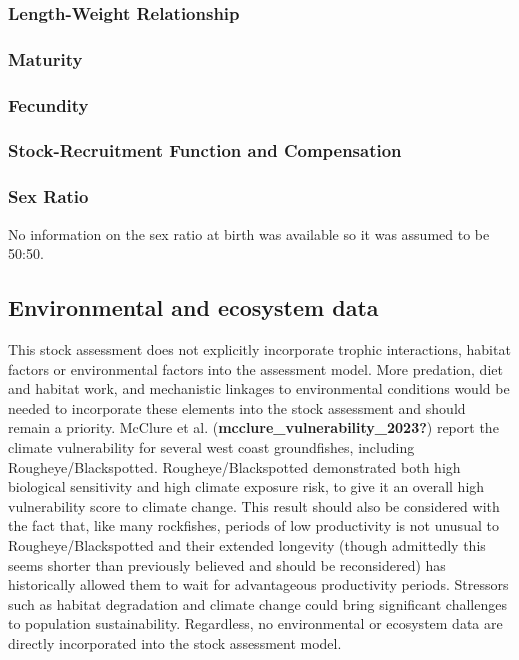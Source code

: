 \documentclass[
]{scrartcl}
\begin{document}
\subsubsection{Length-Weight
Relationship}\label{length-weight-relationship}

\subsubsection{Maturity}\label{maturity}

\subsubsection{Fecundity}\label{fecundity}

\subsubsection{Stock-Recruitment Function and
Compensation}\label{stock-recruitment-function-and-compensation}

\subsubsection{Sex Ratio}\label{sex-ratio}

No information on the sex ratio at birth was available so it was assumed
to be 50:50.

\subsection{Environmental and ecosystem
data}\label{environmental-and-ecosystem-data}

This stock assessment does not explicitly incorporate trophic
interactions, habitat factors or environmental factors into the
assessment model. More predation, diet and habitat work, and mechanistic
linkages to environmental conditions would be needed to incorporate
these elements into the stock assessment and should remain a priority.
McClure et al. (\textbf{mcclure\_vulnerability\_2023?}) report the
climate vulnerability for several west coast groundfishes, including
Rougheye/Blackspotted. Rougheye/Blackspotted demonstrated both high
biological sensitivity and high climate exposure risk, to give it an
overall high vulnerability score to climate change. This result should
also be considered with the fact that, like many rockfishes, periods of
low productivity is not unusual to Rougheye/Blackspotted and their
extended longevity (though admittedly this seems shorter than previously
believed and should be reconsidered) has historically allowed them to
wait for advantageous productivity periods. Stressors such as habitat
degradation and climate change could bring significant challenges to
population sustainability. Regardless, no environmental or ecosystem
data are directly incorporated into the stock assessment model.
\end{document}
